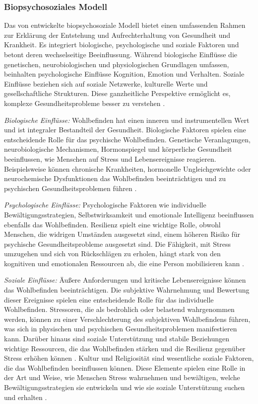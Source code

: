 \subsubsection{Biopsychosoziales Modell}  \label{2.1.3.1}
Das von \textcite{Engel1977} entwickelte biopsychosoziale Modell bietet einen umfassenden Rahmen zur Erklärung der Entstehung und Aufrechterhaltung von Gesundheit und Krankheit. Es integriert biologische, psychologische und soziale Faktoren und betont deren wechselseitige Beeinflussung. Während biologische Einflüsse die genetischen, neurobiologischen und physiologischen Grundlagen umfassen, beinhalten psychologische Einflüsse Kognition, Emotion und Verhalten. Soziale Einflüsse beziehen sich auf soziale Netzwerke, kulturelle Werte und gesellschaftliche Strukturen. Diese ganzheitliche Perspektive ermöglicht es, komplexe Gesundheitsprobleme besser zu verstehen \parencite{Borrell-Carrió2004}.

\textit{Biologische Einflüsse:}
Wohlbefinden hat einen inneren und instrumentellen Wert und ist integraler Bestandteil der Gesundheit. Biologische Faktoren spielen eine entscheidende Rolle für das psychische Wohlbefinden. Genetische Veranlagungen, neurobiologische Mechanismen, Hormonspiegel und körperliche Gesundheit beeinflussen, wie Menschen auf Stress und Lebensereignisse reagieren. Beispielsweise können chronische Krankheiten, hormonelle Ungleichgewichte oder neurochemische Dysfunktionen das Wohlbefinden beeinträchtigen und zu psychischen Gesundheitsproblemen führen \parencite{Sapolsky2004, Kiecolt-Glaser2002}.

\textit{Psychologische Einflüsse:}
Psychologische Faktoren wie individuelle Bewältigungsstrategien, Selbstwirksamkeit und emotionale Intelligenz beeinflussen ebenfalls das Wohlbefinden. Resilienz spielt eine wichtige Rolle, obwohl Menschen, die widrigen Umständen ausgesetzt sind, einem höheren Risiko für psychische Gesundheitsprobleme ausgesetzt sind. Die Fähigkeit, mit Stress umzugehen und sich von Rückschlägen zu erholen, hängt stark von den kognitiven und emotionalen Ressourcen ab, die eine Person mobilisieren kann \parencite{Bandura1997, Carver2010}.

\textit{Soziale Einflüsse:}
Äußere Anforderungen und kritische Lebensereignisse können das Wohlbefinden beeinträchtigen. Die subjektive Wahrnehmung und Bewertung dieser Ereignisse spielen eine entscheidende Rolle für das individuelle Wohlbefinden. Stressoren, die als bedrohlich oder belastend wahrgenommen werden, können zu einer Verschlechterung des subjektiven Wohlbefindens führen, was sich in physischen und psychischen Gesundheitsproblemen manifestieren kann. Darüber hinaus sind soziale Unterstützung und stabile Beziehungen wichtige Ressourcen, die das Wohlbefinden stärken und die Resilienz gegenüber Stress erhöhen können \parencite{LazarusFolkman1987, Pearlin2010, Uchino2006}. Kultur und Religiosität sind wesentliche soziale Faktoren, die das Wohlbefinden beeinflussen können. Diese Elemente spielen eine Rolle in der Art und Weise, wie Menschen Stress wahrnehmen und bewältigen, welche Bewältigungsstrategien sie entwickeln und wie sie soziale Unterstützung suchen und erhalten \parencite{MatsumotoJuang2016}. 

